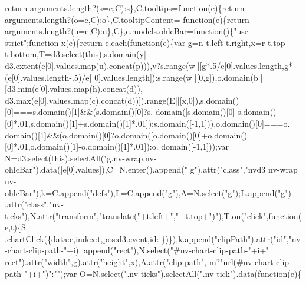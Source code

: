 \begin{DoxyCode}
{      return} arguments.length?(s=e,C):s\},C.tooltips=\textcolor{keyword}{function}(e)\{\textcolor{keywordflow}{return} arguments.length?(o=e,C):o\},C.tooltipContent=\textcolor{keyword}{
      function}(e)\{\textcolor{keywordflow}{return} arguments.length?(u=e,C):u\},C\},e.models.ohlcBar=\textcolor{keyword}{function}()\{\textcolor{stringliteral}{"use strict"};\textcolor{keyword}{function} 
      x(e)\{\textcolor{keywordflow}{return} e.each(\textcolor{keyword}{function}(e)\{var g=n-t.left-t.right,x=r-t.top-t.bottom,T=d3.select(\textcolor{keyword}{this});s.domain(y||
      d3.extent(e[0].values.map(u).concat(p))),v?s.range(w||[g*.5/e[0].values.length,g*(e[0].values.length-.5)/e[
      0].values.length]):s.range(w||[0,g]),o.domain(b||[d3.min(e[0].values.map(h).concat(d)),
      d3.max(e[0].values.map(c).concat(d))]).range(E||[x,0]),s.domain()[0]===s.domain()[1]&&(s.domain()[0]?s.
      domain([s.domain()[0]-s.domain()[0]*.01,s.domain()[1]+s.domain()[1]*.01]):s.domain([-1,1])),o.domain()[0]===o.
      domain()[1]&&(o.domain()[0]?o.domain([o.domain()[0]+o.domain()[0]*.01,o.domain()[1]-o.domain()[1]*.01]):o.
      domain([-1,1]));var N=d3.select(\textcolor{keyword}{this}).selectAll(\textcolor{stringliteral}{"g.nv-wrap.nv-ohlcBar"}).data([e[0].values]),C=N.enter().append(\textcolor{stringliteral}{"
      g"}).attr(\textcolor{stringliteral}{"class"},\textcolor{stringliteral}{"nvd3 nv-wrap nv-ohlcBar"}),k=C.append(\textcolor{stringliteral}{"defs"}),L=C.append(\textcolor{stringliteral}{"g"}),A=N.select(\textcolor{stringliteral}{"g"});L.append(\textcolor{stringliteral}{"g"})
      .attr(\textcolor{stringliteral}{"class"},\textcolor{stringliteral}{"nv-ticks"}),N.attr(\textcolor{stringliteral}{"transform"},\textcolor{stringliteral}{"translate("}+t.left+\textcolor{stringliteral}{","}+t.top+\textcolor{stringliteral}{")"}),T.on(\textcolor{stringliteral}{"click"},\textcolor{keyword}{function}(e,t)\{S
      .chartClick(\{data:e,index:t,pos:d3.event,\textcolor{keywordtype}{id}:i\})\}),k.append(\textcolor{stringliteral}{"clipPath"}).attr(\textcolor{stringliteral}{"id"},\textcolor{stringliteral}{"nv-chart-clip-path-"}+i).
      append(\textcolor{stringliteral}{"rect"}),N.select(\textcolor{stringliteral}{"#nv-chart-clip-path-"}+i+\textcolor{stringliteral}{" rect"}).attr(\textcolor{stringliteral}{"width"},g).attr(\textcolor{stringliteral}{"height"},x),A.attr(\textcolor{stringliteral}{"clip-path"},
      m?\textcolor{stringliteral}{"url(#nv-chart-clip-path-"}+i+\textcolor{stringliteral}{")"}:\textcolor{stringliteral}{""});var O=N.select(\textcolor{stringliteral}{".nv-ticks"}).selectAll(\textcolor{stringliteral}{".nv-tick"}).data(\textcolor{keyword}{function}(e)\{\textcolor{keywordflow}{
}
\end{DoxyCode}
